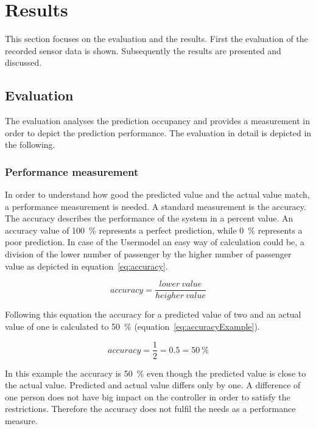\section{Results}
\label{sec:results}

This section focuses on the evaluation and the results. First the evaluation of the recorded sensor data is shown. Subsequently the results are presented and discussed.

\subsection{Evaluation}
\label{subsec:evaluation}

The evaluation analyses the prediction occupancy and provides a measurement in order to depict the prediction performance. The evaluation in detail is depicted in the following.

\subsubsection{Performance measurement}
\label{subsubsec:performanceMeasurement}

In order to understand how good the predicted value and the actual value match, a performance measurement is needed. A standard measurement is the accuracy. The accuracy describes the performance of the system in a percent value. An accuracy value of 100~\% represents a perfect prediction, while 0~\% represents a poor prediction. In case of the Usermodel an easy way of calculation could be, a division of the lower number of passenger by the higher number of passenger value as depicted in equation~\ref{eq:accuracy}.

\begin{equation}
accuracy = \frac{lower~value}{heigher~value}
\label{eq:accuracy}
\end{equation}

Following this equation the accuracy for a predicted value of two and an actual value of one is calculated to 50~\% (equation~\ref{eq:accuracyExample}).

\begin{equation}
accuracy = \frac{1}{2} = 0.5 = 50~\%
\label{eq:accuracyExample}
\end{equation}

In this example the accuracy is 50~\% even though the predicted value is close to the actual value. Predicted and actual value differs only by one. A difference of one person does not have big impact on the controller in order to satisfy the restrictions. Therefore the accuracy does not fulfil the needs as a performance measure.

